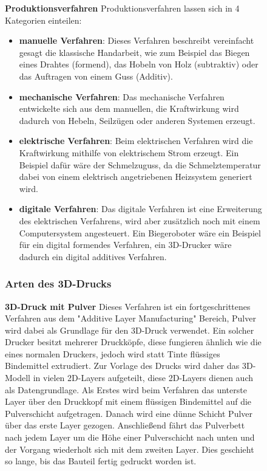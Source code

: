 \begin{figure}
\textbf{Produktionsverfahren}
Produktionsverfahren lassen sich in 4 Kategorien einteilen:
\begin{itemize}
    \item \textbf{manuelle Verfahren}: Dieses Verfahren beschreibt vereinfacht gesagt die klassische  Handarbeit, wie zum Beispiel das Biegen eines Drahtes (formend), das Hobeln von Holz (subtraktiv) oder das Auftragen von einem Guss (Additiv).
    \item \textbf{mechanische Verfahren}: Das mechanische Verfahren entwickelte sich aus dem manuellen, die Kraftwirkung wird dadurch von Hebeln, Seilzügen oder anderen Systemen erzeugt.
    \item \textbf{elektrische Verfahren}: Beim elektrischen Verfahren wird die Kraftwirkung mithilfe von elektrischem Strom erzeugt. Ein Beispiel dafür wäre der Schmelzuguss, da die Schmelztemperatur dabei von einem elektrisch angetriebenen Heizsystem generiert wird.
    \item \textbf{digitale Verfahren}: Das digitale Verfahren ist eine Erweiterung des elektrischen Verfahrens, wird aber zusätzlich noch mit einem Computersystem angesteuert. Ein Biegeroboter wäre ein Beispiel für ein digital formendes Verfahren, ein 3D-Drucker wäre dadurch ein digital additives Verfahren.
\end{itemize}

\subsubsection{Arten des 3D-Drucks}
\textbf{3D-Druck mit Pulver}
Dieses Verfahren ist ein fortgeschrittenes Verfahren aus dem "Additive Layer Manufacturing" Bereich, Pulver wird dabei
als Grundlage für den 3D-Druck verwendet. Ein solcher Drucker besitzt mehrerer Druckköpfe, diese fungieren ähnlich wie
die eines normalen Druckers, jedoch wird statt Tinte flüssiges Bindemittel extrudiert. Zur Vorlage des Drucks wird daher das
3D-Modell in vielen 2D-Layers aufgeteilt, diese 2D-Layers dienen auch als Datengrundlage.
Als Erstes wird beim Verfahren das unterste Layer über den Druckkopf mit einem flüssigen Bindemittel auf die Pulverschicht
aufgetragen. Danach wird eine dünne Schicht Pulver über das erste Layer gezogen. Anschließend fährt
das Pulverbett nach jedem Layer um die Höhe einer Pulverschicht nach unten und der Vorgang wiederholt sich mit dem
zweiten Layer. Dies geschieht so lange, bis das Bauteil fertig gedruckt worden ist.\\


\end{figure}

